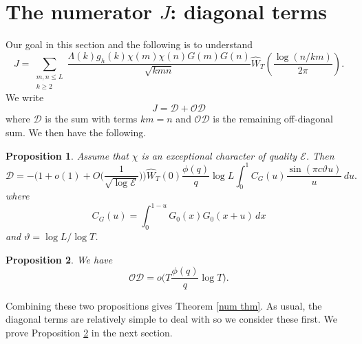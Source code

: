 \documentclass[12pt, oneside]{amsart}
\newtheorem{prop}{Proposition}
\theoremstyle{definition}
\newcommand{\mc}{\mathcal}
\newcommand{\leqs}{\leqslant }
\newcommand{\geqs}{\geqslant }
\newcommand{\wh}{\widehat}
\newcommand{\1}{\mathds{1}}
\begin{document}
\section{The numerator $J$: diagonal terms}

Our goal in this section and the following is to understand
\[
J=\sum_{\substack{m,n\leqs L\\k\geqs 2}} \frac{\Lambda(k)g_h(k)\chi(m)\chi(n)G(m)G(n)}{\sqrt{kmn}}
\wh W_T\!\left(\frac{\log(n/km)}{2\pi}\right).
\]
We write 
\[
J=
\mc{D}+\mc{OD}
\]
where $\mc{D}$ is the sum with terms $km=n$ and $\mc{OD}$ is the remaining off-diagonal sum. We then have the following. 

\begin{prop}
\label{prop:diagonal}
Assume that $\chi$ is an exceptional character of quality $\mc{E}$. Then 
\[
\mc{D}=-
\Big(1+o(1)+O\Big(\frac{1}{\sqrt{\log\mc{E}}}\Big)\Big)\wh W_T(0)\frac{\phi(q)}q\log L
 \int_0^1 C_G(u)
 \frac{\sin(\pi c\vartheta u)}u\,du.
\]
where 
\[ C_G(u)=\int_0^{1-u}G_0(x)G_0(x+u)\,dx\]
and $\vartheta=\log L/\log T$.
\end{prop}

\begin{prop}\label{off diag prop}
We have 
\[
\mc{OD}=o\Big(T\frac{\phi(q)}{q}\log T\Big).
\]
\end{prop}
Combining these two propositions gives Theorem \ref{num thm}. 
As usual, the diagonal terms are relatively simple to deal with so we consider these first. 
We prove Proposition \ref{off diag prop} in the next section. 
\end{document}
